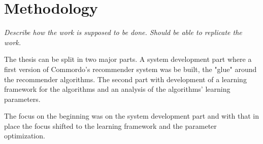 \chapter{Methodology}\label{cha:method}

\textit{Describe how the work is supposed to be done. Should be able to replicate the work.}

The thesis can be split in two major parts. A system development part where a first version of Commordo's recommender system was be built, the "glue" around the recommender algorithms. The second part with development of a learning framework for the algorithms and an analysis of the algorithms' learning parameters.

The focus on the beginning was on the system development part and with that in place the focus shifted to the learning framework and the parameter optimization.





